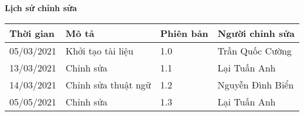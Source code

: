 \documentclass[./main.tex]{subfiles}
\begin{document}
\begin{center}
	\Large{\textbf{Lịch sử chỉnh sửa}}
	\begin{table}[H]
		\begin{tabular}{|p{}|p{}|p{}|p{}|}
			\hline
			\textbf{Thời gian} & \textbf{Mô tả}      & \textbf{Phiên bản} & \textbf{Người chỉnh sửa} \\ \hline
			05/03/2021         & Khởi tạo tài liệu   & 1.0                & Trần Quốc Cường          \\ \hline
			13/03/2021         & Chỉnh sửa           & 1.1                & Lại Tuấn Anh             \\ \hline
			14/03/2021         & Chỉnh sửa thuật ngữ & 1.2                & Nguyễn Đình Biển         \\ \hline
			05/05/2021         & Chỉnh sửa           & 1.3                & Lại Tuấn Anh             \\ \hline
		\end{tabular}
	\end{table}
\end{center}
\end{document}
